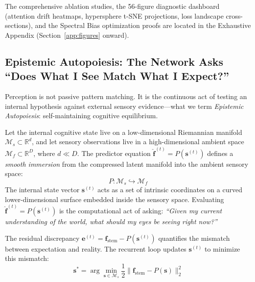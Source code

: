 \documentclass[12pt,a4paper]{article}
\begin{document}
The comprehensive ablation studies, the 56-figure diagnostic dashboard
(attention drift heatmaps, hypersphere t-SNE projections, loss landscape
cross-sections), and the Spectral Bias optimization proofs are located
in the Exhaustive Appendix (Section~\ref{app:figures} onward).

\subsection{Epistemic Autopoiesis: The Network Asks ``Does What I See
Match What I Expect?''}
\label{sec:autopoiesis}

Perception is not passive pattern matching. It is the continuous act of
testing an internal hypothesis against external sensory evidence---what
we term \textit{Epistemic Autopoiesis}: self-maintaining cognitive
equilibrium.

Let the internal cognitive state live on a low-dimensional Riemannian
manifold $\mathcal{M}_s \subset \mathbb{R}^d$, and let sensory observations
live in a high-dimensional ambient space
$\mathcal{M}_f \subset \mathbb{R}^D$, where $d \ll D$. The predictor
equation $\hat{\mathbf{f}}^{(t)} = P(\mathbf{s}^{(t)})$ defines a
\textit{smooth immersion} from the compressed latent manifold into the
ambient sensory space:
\begin{equation}
  P: \mathcal{M}_s \hookrightarrow \mathcal{M}_f
\end{equation}
The internal state vector $\mathbf{s}^{(t)}$ acts as a set of intrinsic
coordinates on a curved lower-dimensional surface embedded inside the
sensory space. Evaluating $\hat{\mathbf{f}}^{(t)} = P(\mathbf{s}^{(t)})$
is the computational act of asking: \textit{``Given my current understanding
of the world, what should my eyes be seeing right now?''}

The residual discrepancy
$\mathbf{e}^{(t)} = \mathbf{f}_{\mathrm{stem}} - P(\mathbf{s}^{(t)})$
quantifies the mismatch between expectation and reality. The recurrent loop
updates $\mathbf{s}^{(t)}$ to minimize this mismatch:
\begin{equation}
  \mathbf{s}^* = \arg\min_{\mathbf{s} \in \mathcal{M}_s}
  \frac{1}{2} \|\mathbf{f}_{\mathrm{stem}} - P(\mathbf{s})\|_2^2
\end{equation}
\end{document}
